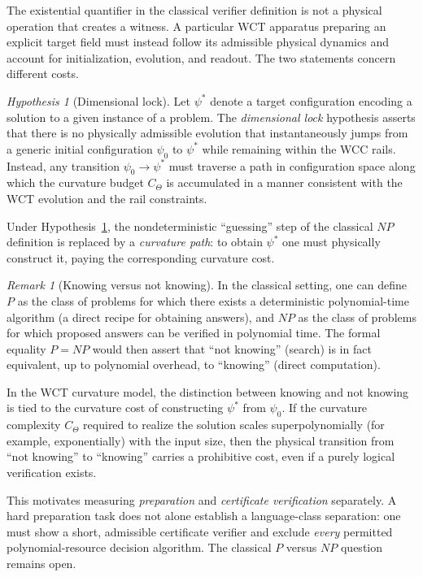\documentclass[12pt]{article}
\theoremstyle{remark}
\newtheorem*{remark}{Remark}
\newtheorem{hypothesis}{Hypothesis}[section]
\begin{document}
The existential quantifier in the classical verifier definition is
not a physical operation that creates a witness. A particular WCT
apparatus preparing an explicit target field must instead follow its
admissible physical dynamics and account for initialization,
evolution, and readout. The two statements concern different costs.

\begin{hypothesis}[Dimensional lock]
\label{hyp:dimensional-lock}
Let $\psi^\ast$ denote a target configuration encoding a solution to a
given instance of a problem. The \emph{dimensional lock} hypothesis
asserts that there is no physically admissible evolution that
instantaneously jumps from a generic initial configuration $\psi_0$ to
$\psi^\ast$ while remaining within the WCC rails. Instead, any
transition $\psi_0 \to \psi^\ast$ must traverse a path in configuration
space along which the curvature budget $C_\Theta$ is accumulated in a
manner consistent with the WCT evolution and the rail constraints.
\end{hypothesis}

Under Hypothesis~\ref{hyp:dimensional-lock}, the nondeterministic
``guessing'' step of the classical $NP$ definition is replaced by a
\emph{curvature path}: to obtain $\psi^\ast$ one must physically
construct it, paying the corresponding curvature cost.

\begin{remark}[Knowing versus not knowing]
\label{rem:knowing-vs-not-knowing}
In the classical setting, one can define $P$ as the class of problems
for which there exists a deterministic polynomial-time algorithm (a
direct recipe for obtaining answers), and $NP$ as the class of
problems for which proposed answers can be verified in polynomial
time. The formal equality $P = NP$ would then assert that ``not
knowing'' (search) is in fact equivalent, up to polynomial overhead,
to ``knowing'' (direct computation).

In the WCT curvature model, the distinction between knowing and not
knowing is tied to the curvature cost of constructing $\psi^\ast$ from
$\psi_0$. If the curvature complexity $C_\Theta$ required to realize
the solution scales superpolynomially (for example, exponentially)
with the input size, then the physical transition from ``not knowing''
to ``knowing'' carries a prohibitive cost, even if a purely logical
verification exists.

This motivates measuring \emph{preparation} and \emph{certificate
verification} separately. A hard preparation task does not alone
establish a language-class separation: one must show a short,
admissible certificate verifier and exclude \emph{every} permitted
polynomial-resource decision algorithm. The classical $P$ versus
$NP$ question remains open.
\end{remark}
\end{document}
